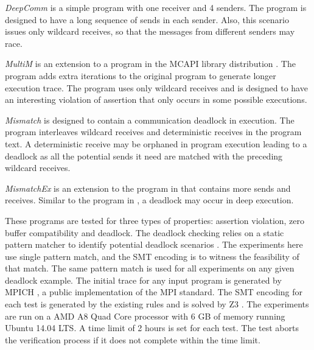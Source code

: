 \begin{compactitem}
\item \textit{DeepComm} is a simple program with one receiver and 4 senders. The program is designed to have a long sequence of sends in each sender.
Also, this scenario issues only wildcard receives, so that the messages from different senders may race.

\item \textit{MultiM} is an extension to a program in the MCAPI library distribution \cite{DBLP:conf/kbse/HuangMM13}. The program adds extra iterations to the original program to generate longer execution trace. The program uses only wildcard receives and is designed to have an interesting violation of assertion that only occurs in some possible executions.

\item \textit{Mismatch} is designed to contain a communication deadlock in execution. The program interleaves wildcard receives and deterministic receives in the program text. A deterministic receive may be orphaned in program execution leading to a deadlock as all the potential sends it need are matched with the preceding wildcard receives. 

\item \textit{MismatchEx} is an extension to the program in  that contains more sends and receives. Similar to the program in , a deadlock may occur in deep execution. 
\end{compactitem}


These programs are tested for three types of properties: assertion violation, zero buffer compatibility and deadlock. 
The deadlock checking relies on a static pattern matcher to identify potential deadlock scenarios \cite{}. 
The experiments here use single pattern match, and the SMT encoding is to witness the feasibility of that match. The same pattern match is used for all experiments on any given deadlock example. 
The initial trace for any input program is generated by MPICH \cite{mpich}, a public implementation of the MPI standard.
The SMT encoding for each test is generated by the existing rules \cite{DBLP:conf/kbse/HuangMM13,HuangNFM15} and is solved by Z3 \cite{demoura:tacas08}. 
The experiments are run on a AMD A8 Quad Core processor with 6 GB of memory running Ubuntu 14.04 LTS. 
A time limit of 2 hours is set for each test. The test aborts the verification process if it does not complete within the time limit.

